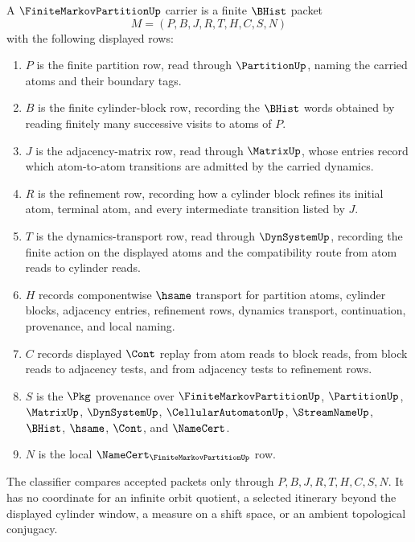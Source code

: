 \begin{definition}
\label{def:finite-markov-partition-carrier}
A $\FiniteMarkovPartitionUp$ carrier is a finite $\BHist$ packet
$$
M=(P,B,J,R,T,H,C,S,N)
$$
with the following displayed rows:
\begin{enumerate}
\item $P$ is the finite partition row, read through $\PartitionUp$, naming the carried atoms and their boundary tags.
\item $B$ is the finite cylinder-block row, recording the $\BHist$ words obtained by reading finitely many successive visits to atoms of $P$.
\item $J$ is the adjacency-matrix row, read through $\MatrixUp$, whose entries record which atom-to-atom transitions are admitted by the carried dynamics.
\item $R$ is the refinement row, recording how a cylinder block refines its initial atom, terminal atom, and every intermediate transition listed by $J$.
\item $T$ is the dynamics-transport row, read through $\DynSystemUp$, recording the finite action on the displayed atoms and the compatibility route from atom reads to cylinder reads.
\item $H$ records componentwise $\hsame$ transport for partition atoms, cylinder blocks, adjacency entries, refinement rows, dynamics transport, continuation, provenance, and local naming.
\item $C$ records displayed $\Cont$ replay from atom reads to block reads, from block reads to adjacency tests, and from adjacency tests to refinement rows.
\item $S$ is the $\Pkg$ provenance over $\FiniteMarkovPartitionUp$, $\PartitionUp$, $\MatrixUp$, $\DynSystemUp$, $\CellularAutomatonUp$, $\StreamNameUp$, $\BHist$, $\hsame$, $\Cont$, and $\NameCert$.
\item $N$ is the local $\NameCert_{\FiniteMarkovPartitionUp}$ row.
\end{enumerate}
The classifier compares accepted packets only through $P,B,J,R,T,H,C,S,N$. It has no coordinate for an infinite orbit quotient, a selected itinerary beyond the displayed cylinder window, a measure on a shift space, or an ambient topological conjugacy.
\end{definition}

